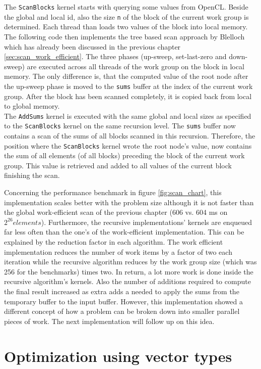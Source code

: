 The \lstinline!ScanBlocks! kernel starts with querying some values from OpenCL. Beside the global and local id, also the size \lstinline!n! of the block of the current work group is determined. Each thread than loads two values of the block into local memory. The following code then implements the tree based scan approach by Blelloch which has already been discussed in the previous chapter \ref{sec:scan_work_efficient}. The three phases (up-sweep, set-last-zero and down-sweep) are executed across all threads of the work group on the block in local memory. The only difference is, that the computed value of the root node after the up-sweep phase is moved to the \lstinline!sums! buffer at the index of the current work group. After the block has been scanned completely, it is copied back from local to global memory. \\
The \lstinline!AddSums! kernel is executed with the same global and local sizes as specified to the \lstinline!ScanBlocks! kernel on the same recursion level. The \lstinline!sums! buffer now contains a scan of the sums of all blocks scanned in this recursion. Therefore, the position where the \lstinline!ScanBlocks! kernel wrote the root node's value, now contains the sum of all elements (of all blocks) preceding the block of the current work group. This value is retrieved and added to all values of the current block finishing the scan.

Concerning the performance benchmark in figure \ref{fig:scan_chart}, this implementation scales better with the problem size although it is not faster than the global work-efficient scan of the previous chapter (606 vs. 604 ms on $2^{26} elements$). Furthermore, the recursive implementations' kernels are enqueued far less often than the one's of the work-efficient implementation. This can be explained by the reduction factor in each algorithm. The work efficient implementation reduces the number of work items by a factor of two each iteration while the recursive algorithm reduces by the work group size (which was 256 for the benchmarks) times two. In return, a lot more work is done inside the recursive algorithm's kernels. Also the number of additions required to compute the final result increased as extra adds a needed to apply the sums from the temporary buffer to the input buffer.
However, this implementation showed a different concept of how a problem can be broken down into smaller parallel pieces of work. The next implementation will follow up on this idea.

\section{Optimization using vector types}
\label{sec:scan_vector}

